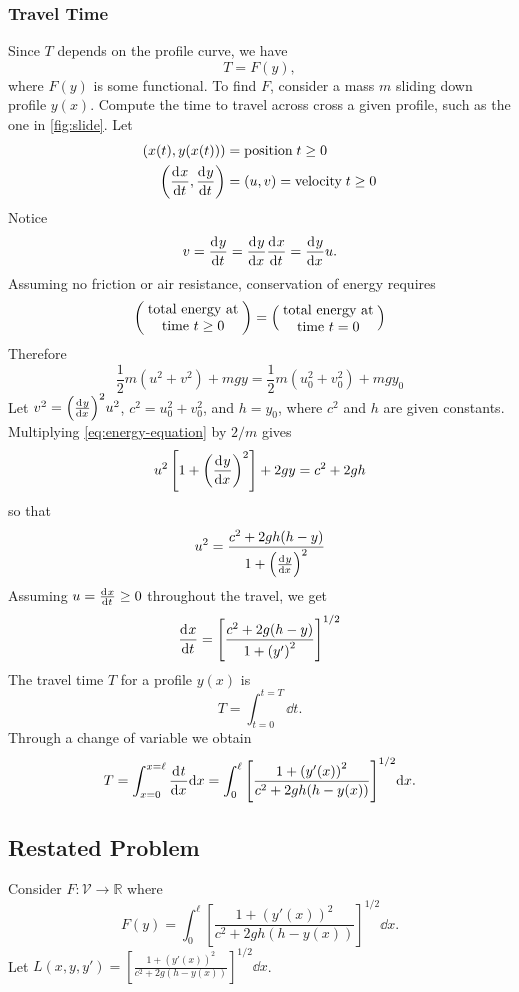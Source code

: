 \documentclass[12pt,twoside]{article}
\begin{document}
\subsubsection{Travel Time}
Since $T$ depends on the profile curve, we have
$$T=F(y),$$ where $F(y)$ is some functional. To find $F$, consider a mass $m$
sliding down profile $y(x)$. Compute the time to travel across cross a given
profile, such as the one in \cref{fig:slide}. Let
\begin{align*}
  (x(t),y(x(t))) &= \text{position}\;t\ge0 \\
  \left(\frac{\mathrm{d}^{} {x}}{\mathrm{d}{t}^{}},\frac{\mathrm{d}^{} {y}}{\mathrm{d}{t}^{}}\right) &= (u,v) = \text{velocity}\;t\ge0
\end{align*}
Notice
$$v=\frac{\mathrm{d}^{} {y}}{\mathrm{d}{t}^{}}=\frac{\mathrm{d}^{} {y}}{\mathrm{d}{x}^{}}\frac{\mathrm{d}^{} {x}}{\mathrm{d}{t}^{}}=\frac{\mathrm{d}^{} {y}}{\mathrm{d}{x}^{}}u.$$
Assuming no friction or air resistance, conservation of energy requires
\begin{equation*}
  \left( \text{\parbox{7em}{\centering total energy at time $t\ge0$}} \right) =
  \left( \text{\parbox{7em}{\centering total energy at time $t=0$}} \right)
\end{equation*}
Therefore
\begin{equation}
  \label{eq:energy-equation}
  \frac{1}{2}m(u^2+v^2)+mgy = \frac{1}{2}m(u_0^2+v_0^2)+mgy_0
\end{equation}
Let $v^2={\left( \frac{\mathrm{d}^{} {y}}{\mathrm{d}{x}^{}} \right)}^2u^2$, $c^2=u_0^2+v_0^2$, and $h=y_0$, where
$c^2$ and $h$ are given constants. Multiplying \cref{eq:energy-equation} by
$2/m$ gives
\begin{equation*}
  u^2\left[ 1+{\left( \frac{\mathrm{d}^{} {y}}{\mathrm{d}{x}^{}} \right)}^2 \right]+2gy = c^2+2gh
\end{equation*}
so that
\begin{equation*}
  u^2 = \frac{c^2+2gh(h-y)}{1+{\left( \frac{\mathrm{d}^{} {y}}{\mathrm{d}{x}^{}} \right)}^2}
\end{equation*}
Assuming $u=\frac{\mathrm{d}^{} {x}}{\mathrm{d}{t}^{}}\ge0$ throughout the travel, we get
\begin{equation*}
  \frac{\mathrm{d}^{} {x}}{\mathrm{d}{t}^{}} = {\left[ \frac{c^2+2g(h-y)}{1+{(y')}^2} \right]}^{1/2}
\end{equation*}
The travel time $T$ for a profile $y(x)$ is
\begin{equation*}
  T=\int_{t=0}^{t=T} \dd{t}.
\end{equation*}
Through a change of variable we obtain
\begin{equation*}
  T=\int_{x=0}^{x=\ell} \frac{\mathrm{d}^{} {t}}{\mathrm{d}{x}^{}} \mathrm{d}{x}
  = \int_0^{\ell} {\left[ \frac{1+{(y'(x))}^2}{c^2+2gh(h-y(x))} \right]}^{1/2} \mathrm{d}{x}.
\end{equation*}

\subsection{Restated Problem}
Consider $F:\mathcal{V}\rightarrow\mathbb{R}$ where
\begin{equation*}
  F(y)=\int_0^{\ell}  {\left[ \frac{1+{(y'(x))}^2}{c^2+2gh(h-y(x))} \right]}^{1/2} \dd{x}.
\end{equation*}
Let $L(x,y,y')= {\left[ \frac{1+{(y'(x))}^2}{c^2+2g(h-y(x))} \right]}^{1/2} \dd{x}$.
\end{document}
